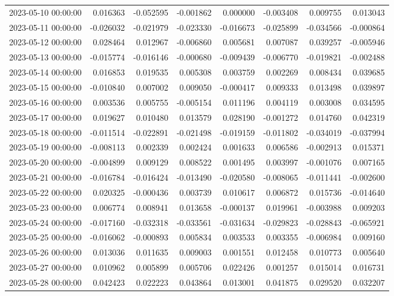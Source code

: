 \begin{tabular}{lrrrrrrr}
2023-05-10 00:00:00 & 0.016363 & -0.052595 & -0.001862 & 0.000000 & -0.003408 & 0.009755 & 0.013043 \\
2023-05-11 00:00:00 & -0.026032 & -0.021979 & -0.023330 & -0.016673 & -0.025899 & -0.034566 & -0.000864 \\
2023-05-12 00:00:00 & 0.028464 & 0.012967 & -0.006860 & 0.005681 & 0.007087 & 0.039257 & -0.005946 \\
2023-05-13 00:00:00 & -0.015774 & -0.016146 & -0.000680 & -0.009439 & -0.006770 & -0.019821 & -0.002488 \\
2023-05-14 00:00:00 & 0.016853 & 0.019535 & 0.005308 & 0.003759 & 0.002269 & 0.008434 & 0.039685 \\
2023-05-15 00:00:00 & -0.010840 & 0.007002 & 0.009050 & -0.000417 & 0.009333 & 0.013498 & 0.039897 \\
2023-05-16 00:00:00 & 0.003536 & 0.005755 & -0.005154 & 0.011196 & 0.004119 & 0.003008 & 0.034595 \\
2023-05-17 00:00:00 & 0.019627 & 0.010480 & 0.013579 & 0.028190 & -0.001272 & 0.014760 & 0.042319 \\
2023-05-18 00:00:00 & -0.011514 & -0.022891 & -0.021498 & -0.019159 & -0.011802 & -0.034019 & -0.037994 \\
2023-05-19 00:00:00 & -0.008113 & 0.002339 & 0.002424 & 0.001633 & 0.006586 & -0.002913 & 0.015371 \\
2023-05-20 00:00:00 & -0.004899 & 0.009129 & 0.008522 & 0.001495 & 0.003997 & -0.001076 & 0.007165 \\
2023-05-21 00:00:00 & -0.016784 & -0.016424 & -0.013490 & -0.020580 & -0.008065 & -0.011441 & -0.002600 \\
2023-05-22 00:00:00 & 0.020325 & -0.000436 & 0.003739 & 0.010617 & 0.006872 & 0.015736 & -0.014640 \\
2023-05-23 00:00:00 & 0.006774 & 0.008941 & 0.013658 & -0.000137 & 0.019961 & -0.003988 & 0.009203 \\
2023-05-24 00:00:00 & -0.017160 & -0.032318 & -0.033561 & -0.031634 & -0.029823 & -0.028843 & -0.065921 \\
2023-05-25 00:00:00 & -0.016062 & -0.000893 & 0.005834 & 0.003533 & 0.003355 & -0.006984 & 0.009160 \\
2023-05-26 00:00:00 & 0.013036 & 0.011635 & 0.009003 & 0.001551 & 0.012458 & 0.010773 & 0.005640 \\
2023-05-27 00:00:00 & 0.010962 & 0.005899 & 0.005706 & 0.022426 & 0.001257 & 0.015014 & 0.016731 \\
2023-05-28 00:00:00 & 0.042423 & 0.022223 & 0.043864 & 0.013001 & 0.041875 & 0.029520 & 0.032207 \\

\end{tabular}
